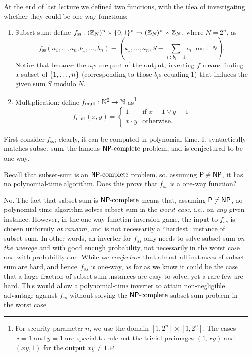 \documentclass[11pt]{article}
\begin{document}
At the end of last lecture we defined two functions, with the idea of
investigating whether they could be one-way functions:
\begin{enumerate}
\item Subset-sum: define $f_{\text{ss}} : (\mathbb{Z}_{N})^{n} \times \{0,1\}^{n}
  \to (\mathbb{Z}_{N})^{n} \times \mathbb{Z}_{N}$, where $N = 2^{n}$, as \[
  f_{\text{ss}}(a_{1}, \ldots, a_{n}, b_{1}, \ldots, b_{n}) = (a_{1},
  \ldots, a_{n}, S = \sum_{i\; :\; b_{i} = 1} a_{i} \bmod N). \]
  Notice that because the $a_{i}$s are part of the output, inverting
  $f$ means finding a subset of $\{1,\ldots,n\}$ (corresponding to
  those $b_{i}$s equaling $1$) that induces the given sum $S$ modulo
  $N$.
\item Multiplication: define $f_{\text{mult}} : \mathbb{N}^{2} \to \mathbb{N}$
  as\footnote{For security parameter $n$, we use the domain $[1,2^{n}]
    \times [1,2^{n}]$.  The cases $x=1$ and $y=1$ are special to rule
    out the trivial preimages $(1,xy)$ and $(xy, 1)$ for the output
    $xy \neq 1$.}
  \[
  f_{\text{mult}}(x,y) =
  \begin{cases}
    1 & \text{if } x=1 \vee y=1 \\
    x \cdot y & \text{otherwise.}
  \end{cases}
  \]
\end{enumerate}

First consider $f_{\text{ss}}$; clearly, it can be computed in
polynomial time. It syntactically matches subset-sum, the famous
$\mathsf{NP}\text{-complete}$ problem, and is conjectured to be one-way.

\begin{question}
  Recall that subset-sum is an \(\mathsf{NP}\text{-complete}\) problem, so,
  assuming \(\mathsf{P} \neq \mathsf{NP}\), it has no polynomial-time algorithm. Does
  this prove that \(f_{ss}\) is a one-way function?
\end{question}

\begin{answer}
  No. The fact that subset-sum is \(\mathsf{NP}\text{-complete}\) means that,
  assuming \(\mathsf{P} \neq \mathsf{NP}\), no polynomial-time algorithm solves
  subset-sum in the \emph{worst case}, i.e., on \emph{any} given
  instance. However, in the one-way function inversion game, the input
  to \(f_{ss}\) is chosen uniformly \emph{at random}, and is not
  necessarily a ``hardest'' instance of subset-sum. In other words, an
  inverter for \(f_{ss}\) only needs to solve subset-sum \emph{on the
    average} and with good enough probability, not necessarily in the
  worst case and with probability one. While we \emph{conjecture} that
  almost all instances of subset-sum are hard, and hence~\(f_{ss}\) is
  one-way, as far as we know it could be the case that a large
  fraction of subset-sum instances are easy to solve, yet a rare few
  are hard. This would allow a polynomial-time inverter to attain
  non-negligible advantage against \(f_{ss}\) without solving the
  \(\mathsf{NP}\text{-complete}\) subset-sum problem in the worst case.
\end{answer}
\end{document}
